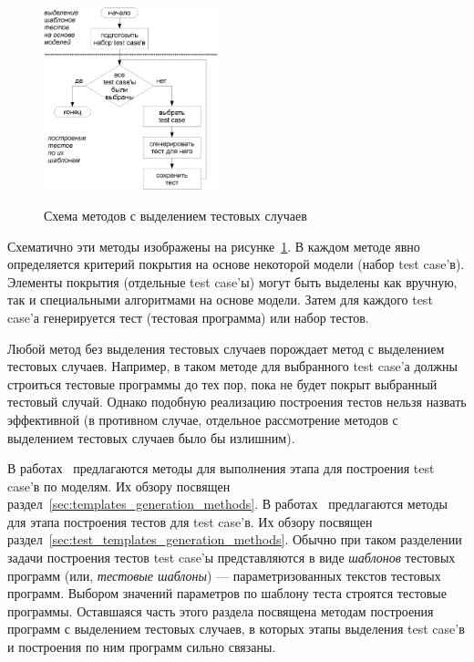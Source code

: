 \begin{figure}[h] \center
  \includegraphics[width=0.45\textwidth]{1.review/methods2}\\
  \caption{Схема методов с выделением тестовых случаев}\label{fig:methods2}
\end{figure}

Схематично эти методы изображены на рисунке~\ref{fig:methods2}. В каждом методе явно определяется критерий покрытия на основе некоторой модели (набор test case'в). Элементы покрытия (отдельные test case'ы) могут быть выделены как вручную, так и специальными алгоритмами на основе модели. Затем для каждого test case'а генерируется тест (тестовая программа) или набор тестов.

Любой метод без выделения тестовых случаев порождает метод с выделением тестовых случаев. Например, в таком методе для выбранного test case'а должны строиться тестовые программы до тех пор, пока не будет покрыт выбранный тестовый случай. Однако подобную реализацию построения тестов нельзя назвать эффективной (в противном случае, отдельное рассмотрение методов с выделением тестовых случаев было бы излишним).


В работах~\cite{UrFSM, mVpGen, MicroTESK} предлагаются методы для выполнения этапа для построения test case'в по моделям. Их обзору посвящен раздел~\ref{sec:templates_generation_methods}. В работах~\cite{MicroTESK, SEGUE1, SEGUE2, PA-RISC, TSE, Theo, mVpGen, GeneticTemplates, GenesysPro, GenesysPro2004Innovations, DeepTrans, RAVEN, MAATG} предлагаются методы для этапа построения тестов для test case'в. Их обзору посвящен раздел~\ref{sec:test_templates_generation_methods}. Обычно при таком разделении задачи построения тестов test case'ы представляются в виде \emph{шаблонов} тестовых программ (или, \emph{тестовые шаблоны}) --- параметризованных текстов тестовых программ. Выбором значений параметров по шаблону теста строятся тестовые программы. Оставшаяся часть этого раздела посвящена методам построения программ с выделением тестовых случаев, в которых этапы выделения test case'в и построения по ним программ сильно связаны.


